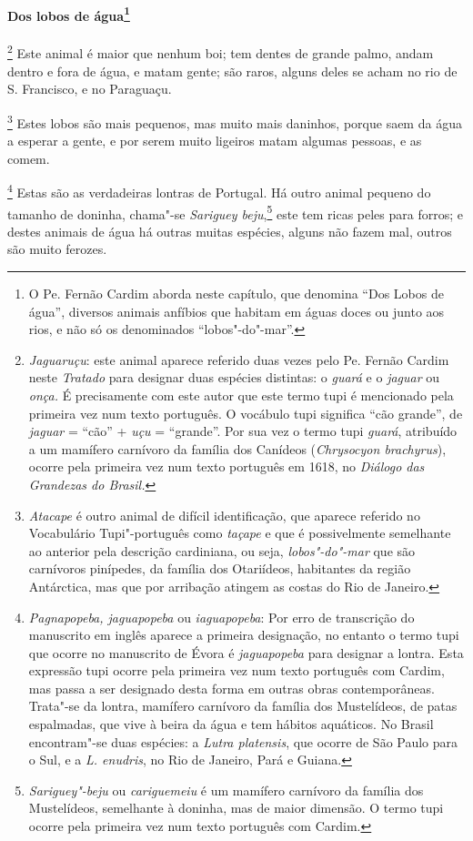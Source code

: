 \begin{linenumbers}
\paragraph[Dos lobos de água]{Dos lobos de água\protect\footnote{ O Pe. Fernão Cardim aborda
neste capítulo, que denomina ``Dos Lobos de água'', diversos animais
anfíbios que habitam em águas doces ou junto aos rios, e não só os
denominados ``lobos"-do"-mar''.}} \quad
{}\footnote{ \textit{Jaguaruçu}: este animal
aparece referido duas vezes pelo Pe. Fernão Cardim neste
\textit{Tratado} para designar duas espécies distintas: o \textit{guará}
e o \textit{jaguar} ou \textit{onça.} É precisamente com este autor
que este termo tupi é mencionado pela primeira vez num texto português.
O vocábulo tupi significa ``cão grande'', de \textit{jaguar} = ``cão'' +
\textit{uçu} = ``grande''. Por sua vez o termo tupi \textit{guará}, 
atribuído a um mamífero carnívoro da família dos Canídeos
(\textit{Chrysocyon brachyrus}), ocorre pela primeira vez num texto
português em 1618, no \textit{Diálogo das Grandezas do Brasil.}}
 Este animal é maior que nenhum boi; tem dentes de grande
palmo, andam dentro e fora de água, e matam gente; são raros, alguns
deles se acham no rio de S. Francisco, e no Paraguaçu.

\footnote{ \textit{Atacape} é outro animal de
difícil identificação, que aparece referido no Vocabulário
Tupi"-português como \textit{taçape} e que é possivelmente semelhante ao
anterior pela descrição cardiniana, ou seja, \textit{lobos"-do"-mar} que
são carnívoros pinípedes, da família dos Otariídeos, habitantes da
região Antárctica, mas que por arribação atingem as costas do Rio de
Janeiro.} Estes lobos são mais pequenos, mas muito mais
daninhos, porque saem da água a esperar a gente, e por serem muito
ligeiros matam algumas pessoas, e as comem.

\footnote{ \textit{Pagnapopeba, jaguapopeba} ou
\textit{iaguapopeba}: Por erro de transcrição do manuscrito em inglês
aparece a primeira designação, no entanto o termo tupi que ocorre no
manuscrito de Évora é \textit{jaguapopeba} para designar a lontra. Esta
expressão tupi ocorre pela primeira vez num texto português com Cardim,
mas passa a ser designado desta forma em outras obras contemporâneas.
Trata"-se da lontra, mamífero carnívoro da família dos Mustelídeos, de
patas espalmadas, que vive à beira da água e tem hábitos aquáticos. No
Brasil encontram"-se duas espécies: a \textit{Lutra platensis}, que
ocorre de São Paulo para o Sul, e a \textit{L. enudris}, no Rio de
Janeiro, Pará e Guiana.} Estas são as verdadeiras
lontras de Portugal. Há outro animal pequeno do tamanho de doninha,
chama"-se \textit{Sariguey beju},\footnote{ \textit{Sariguey"-beju} ou
\textit{cariguemeiu} é um mamífero carnívoro da família dos
Mustelídeos, semelhante à doninha, mas de maior dimensão. O termo tupi
ocorre pela primeira vez num texto português com Cardim.} este tem
ricas peles para forros; e destes animais de água há outras muitas
espécies, alguns não fazem mal, outros são muito ferozes.


\end{linenumbers}
